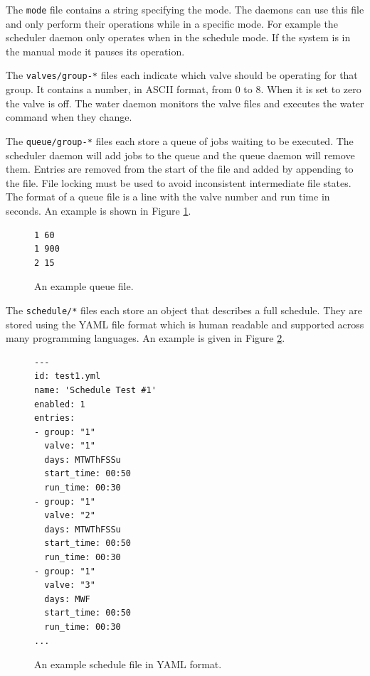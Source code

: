 \documentclass{article}
\begin{document}
The \verb+mode+ file contains a string specifying the mode.
The daemons can use this file and only perform their operations while
in a specific mode.
For example the scheduler daemon only operates when in the schedule mode.
If the system is in the manual mode it pauses its operation.

\clearpage
The \verb+valves/group-*+ files each indicate which valve should be
operating for that group.
It contains a number, in ASCII format, from 0 to 8.
When it is set to zero the valve is off.
The water daemon monitors the valve files and executes the water command
when they change.

The \verb+queue/group-*+ files each store a queue of jobs waiting to be
executed.
The scheduler daemon will add jobs to the queue and the queue daemon
will remove them.
Entries are removed from the start of the file and added by appending to
the file.
File locking must be used to avoid inconsistent intermediate file states.
The format of a queue file is a line with the valve number and run
time in seconds.  An example is shown in Figure \ref{fig:qf}.

\begin{figure}
\begin{center}
\begin{minipage}{2in}
\begin{verbatim}
1 60
1 900
2 15
\end{verbatim}
\end{minipage}
\end{center}
\caption{An example queue file.}
\label{fig:qf}
\end{figure}

The \verb+schedule/*+ files each store an object that describes a full
schedule.
They are stored using the YAML file format which is human readable
and supported across many programming languages.
An example is given in Figure \ref{fig:sched}.

\begin{figure}
\begin{center}
\begin{minipage}{3in}
\begin{verbatim}
---
id: test1.yml
name: 'Schedule Test #1'
enabled: 1
entries:
- group: "1"
  valve: "1"
  days: MTWThFSSu
  start_time: 00:50
  run_time: 00:30
- group: "1"
  valve: "2"
  days: MTWThFSSu
  start_time: 00:50
  run_time: 00:30
- group: "1"
  valve: "3"
  days: MWF
  start_time: 00:50
  run_time: 00:30
...
\end{verbatim}
\end{minipage}
\end{center}
\caption{An example schedule file in YAML format.}
\label{fig:sched}
\end{figure}
\end{document}
